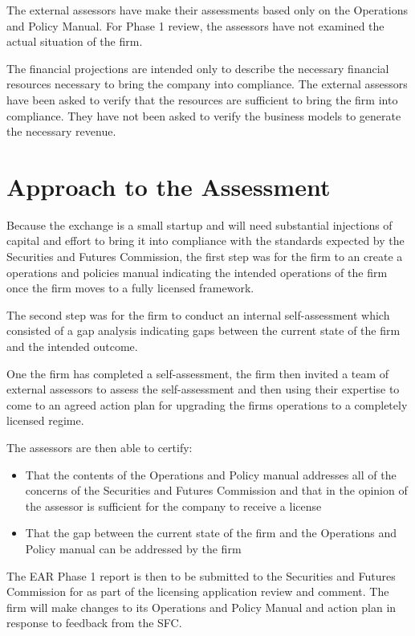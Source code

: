 \documentclass[]{report}
\begin{document}
The external assessors have make their assessments based only on the
Operations and Policy Manual.  For Phase 1 review, the assessors have
not examined the actual situation of the firm.

The financial projections are intended only to describe the necessary
financial resources necessary to bring the company into compliance.
The external assessors have been asked to verify that the resources
are sufficient to bring the firm into compliance.  They have not been
asked to verify the business models to generate the necessary revenue.

\section{Approach to the Assessment}

Because the exchange is a small startup and will need substantial
injections of capital and effort to bring it into compliance with the
standards expected by the Securities and Futures Commission, the first
step was for the firm to an create a operations and policies manual
indicating the intended operations of the firm once the firm moves to
a fully licensed framework.

The second step was for the firm to conduct an internal
self-assessment which consisted of a gap analysis indicating gaps
between the current state of the firm and the intended outcome.

One the firm has completed a self-assessment, the firm then invited a
team of external assessors to assess the self-assessment and then
using their expertise to come to an agreed action plan for upgrading
the firms operations to a completely licensed regime.

The assessors are then able to certify:

\begin{itemize}
  \item That the contents of the Operations and Policy manual
    addresses all of the concerns of the Securities and Futures
    Commission and that in the opinion of the assessor is sufficient
    for the company to receive a license
  \item That the gap between the current state of the firm and the
    Operations and Policy manual can be addressed by the firm
\end{itemize}

The EAR Phase 1 report is then to be submitted to the Securities and
Futures Commission for as part of the licensing application review and
comment.  The firm will make changes to its Operations and Policy
Manual and action plan in response to feedback from the SFC.
\end{document}
